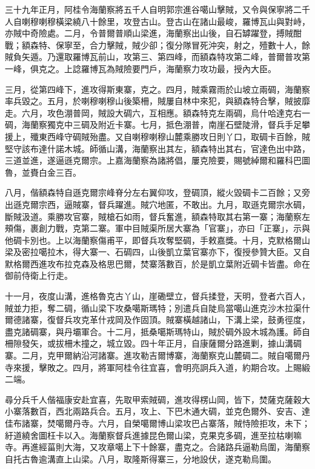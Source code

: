 \begin{pinyinscope}
三十九年正月，阿桂令海蘭察將五千人自明郭宗進谷噶山擊賊，又令與保寧將二千人自喇穆喇穆橫梁繞八十餘里，攻登古山。登古山在諸山最峻，羅博瓦山與對峙，亦賊中奇險處。二月，令普爾普順山梁進，海蘭察出山後，自石罅躍登，搏賊酣戰；額森特、保寧至，合力擊賊，賊少卻；復分隊冒死沖突，射之，殪數十人，餘賊負矢遁。乃還取羅博瓦前山，攻第三、第四峰，而額森特攻第二峰，普爾普攻第一峰，俱克之。上諗羅博瓦為賊險要門戶，海蘭察力攻功最，授內大臣。

三月，從第四峰下，進攻得斯東寨，克之。四月，賊乘霧雨於山坡立兩碉，海蘭察率兵毀之。五月，於喇穆喇穆山後築柵，賊屢自林中來犯，與額森特合擊，賊披靡走。六月，攻色淜普岡，賊設大碉六，互相應。額森特克左兩碉，烏什哈達克右一碉，海蘭察獨克中三碉及附近卡寨。七月，抵色淜普，南崖石壁陡滑，督兵手足攀援上，殲東西峰守碉賊殆盡。又自喇穆喇穆山麓乘勝攻日則丫口，取碉卡百餘，賊堅守該布達什諾木城。師循山溝，海蘭察出其左，額森特出其右，官達色出中路，三道並進，遂逼遜克爾宗。上嘉海蘭察為諸將倡，屢克險要，賜號綽爾和羅科巴圖魯，並賚白金三百。

八月，偕額森特自遜克爾宗峰脊分左右翼仰攻，登碉頂，縱火毀碉卡二百餘；又旁出遜克爾宗西，逼賊寨，督兵躍進。賊穴地匿，不敢出。九月，取遜克爾宗水碉，斷賊汲道。乘勝攻官寨，賊槍石如雨，督兵奮進，額森特取其右第一寨；海蘭察左頰傷，裹創力戰，克第二寨。軍中目賊渠所居大寨為「官寨」，亦曰「正寨」，示與他碉卡別也。上以海蘭察傷甫平，即督兵攻奪堅碉，手敕嘉獎。十月，克默格爾山梁及密拉噶拉木，得大寨一、石碉四，山後凱立葉官寨亦下，復授參贊大臣。又自默格爾西進攻布拉克森及格思巴爾，焚寨落數百，於是凱立葉附近碉卡皆盡。命在御前侍衛上行走。

十一月，夜度山溝，進格魯克古丫山，崖磡壁立，督兵揉登，天明，登者六百人，賊並力拒，奪二碉，循山梁下攻桑噶斯瑪特；別遣兵自陡烏當噶山進克沙木拉渠什爾德諸寨，復督兵攻克革什戎岡及作固頂。賊寨橫越諸山，下溝上梁，鼓勇徑度，盡克諸碉寨，與丹壩軍合。十二月，抵桑噶斯瑪特山，賊於碉外設木城為護。師自柵隙發矢，或拔柵木撞之，城立毀。四十年正月，自康薩爾分路進剿，據山溝碉寨。二月，克甲爾納沿河諸寨。進攻勒吉爾博寨，海蘭察克山麓碉二。賊自噶爾丹寺來援，擊敗之。四月，將軍阿桂令往宜喜，會明亮詗兵入道，約期合攻。上賜緞二端。

尋分兵千人偕福康安赴宜喜，先取甲索賊碉，進攻得楞山岡，皆下，焚薩克薩穀大小寨落數百，西北兩路兵合。五月，攻上、下巴木通大碉，並克色爾外、安吉、達佳布諸寨，焚噶爾丹寺。六月，自榮噶爾博山梁攻巴占寨落，賊恃險拒攻，未下；紆道繞舍圖枉卡以入。海蘭察督兵進據昆色爾山梁，克果克多碉，進至拉枯喇嘛寺。再進經菑則大海，又攻章噶上下十餘寨，盡克之。合諸路兵逼勒烏圍，海蘭察自托古魯逾溝直上山梁。八月，取隆斯得寨三，分地設伏，遂克勒烏圍。


\end{pinyinscope}

